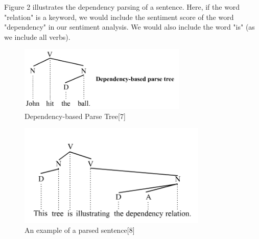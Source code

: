 \documentclass[pageno]{jpaper}
\begin{document}
\indent Figure 2 illustrates the dependency parsing of a sentence. Here, if the word "relation" is a keyword, we would include the sentiment score of the word "dependency" in our sentiment analysis. We would also include the word "is" (as we include all verbs).
\begin{figure}
\centering
\includegraphics[width=80mm]{Parse.jpg}
\caption{Dependency-based Parse Tree[7]}
\label{overflow}
\end{figure}
\begin{figure}
\centering
\includegraphics[width=90mm]{Parse2.png}
\caption{An example of a parsed sentence[8]}
\label{overflow}
\end{figure}
\end{document}
